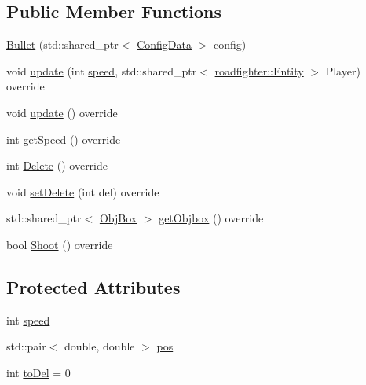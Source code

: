 \subsection*{Public Member Functions}
\begin{DoxyCompactItemize}
\item 
\hyperlink{classroadfighter_1_1Bullet_abcbb5d8fd968f182994fdbca0aab9f6d}{Bullet} (std\+::shared\+\_\+ptr$<$ \hyperlink{classConfigData}{Config\+Data} $>$ config)
\item 
void \hyperlink{classroadfighter_1_1Bullet_a9027c832dce3cd2839192255e0dbf301}{update} (int \hyperlink{classroadfighter_1_1Bullet_a88e3752878d08ceeaaaf307158f20d41}{speed}, std\+::shared\+\_\+ptr$<$ \hyperlink{classroadfighter_1_1Entity}{roadfighter\+::\+Entity} $>$ Player) override
\item 
void \hyperlink{classroadfighter_1_1Bullet_aab45c1cb9088b11c17e7a238543d8006}{update} () override
\item 
int \hyperlink{classroadfighter_1_1Bullet_ad05d66d01f1f839e1f38c6f12a0b091b}{get\+Speed} () override
\item 
int \hyperlink{classroadfighter_1_1Bullet_a011f2271222e0fa9bcf25193c2b94932}{Delete} () override
\item 
void \hyperlink{classroadfighter_1_1Bullet_ac3be16d9ff7da992fc6c5bd641f6d8dc}{set\+Delete} (int del) override
\item 
std\+::shared\+\_\+ptr$<$ \hyperlink{structObjBox}{Obj\+Box} $>$ \hyperlink{classroadfighter_1_1Bullet_a3e410865547614ec0470eb6ad18cc2c4}{get\+Objbox} () override
\item 
bool \hyperlink{classroadfighter_1_1Bullet_a0c093704ce5b9c2f4237d6b5dd1cbd36}{Shoot} () override
\end{DoxyCompactItemize}
\subsection*{Protected Attributes}
\begin{DoxyCompactItemize}
\item 
int \hyperlink{classroadfighter_1_1Bullet_a88e3752878d08ceeaaaf307158f20d41}{speed}
\item 
std\+::pair$<$ double, double $>$ \hyperlink{classroadfighter_1_1Bullet_a55d144151e85951e815d396a45701c8e}{pos}
\item 
int \hyperlink{classroadfighter_1_1Bullet_a400c93d89107eed04fff90f22dd37247}{to\+Del} = 0
\end{DoxyCompactItemize}


